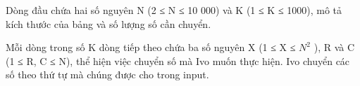Dòng đầu chứa hai số nguyên N (2 ≤ N ≤ 10 000) và K (1 ≤ K ≤ 1000), mô tả kích thước của bảng và số lượng số cần chuyển.

Mỗi dòng trong số K dòng tiếp theo chứa ba số nguyên X (1 ≤ X ≤ $N^{2}$ ), R và C (1 ≤ R, C ≤ N), thể hiện việc chuyển số mà Ivo muốn thực hiện. Ivo chuyển các số theo thứ tự mà chúng được cho trong input.